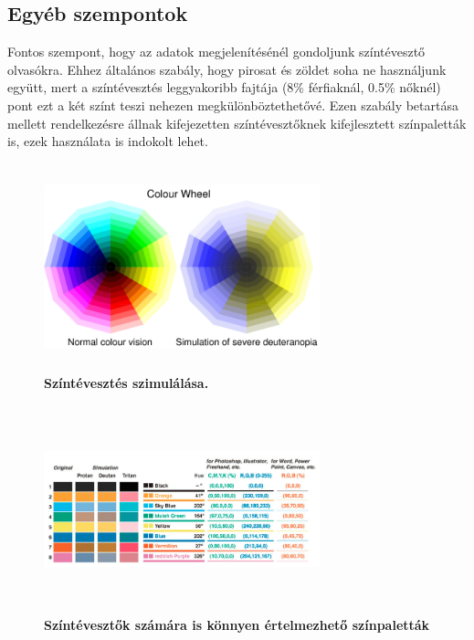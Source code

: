 \documentclass[12pt]{article}
\theoremstyle{plain}
\begin{document}
\subsection{Egyéb szempontok}

Fontos szempont, hogy az adatok megjelenítésénél gondoljunk  színtévesztő olvasókra. Ehhez általános szabály, hogy pirosat és zöldet soha ne használjunk együtt, mert a színtévesztés leggyakoribb fajtája (8\% férfiaknál, 0.5\% nőknél) pont ezt a két színt teszi nehezen megkülönböztethetővé. Ezen szabály betartása mellett rendelkezésre állnak kifejezetten színtévesztőknek kifejlesztett színpaletták is, ezek használata is indokolt lehet. 

\begin{figure}[H]
   \centering
   \includegraphics[width=8cm, height=6cm]{media/cwheel-polar.png}
   \caption{\textbf{Színtévesztés szimulálása.}}
   \label{fig:GeneralDiagram}
\end{figure}

\begin{figure}[H]
   \centering
   \includegraphics[width=8cm, height=6cm]{media/colorb.png}
   \caption{\textbf{Színtévesztők számára is könnyen értelmezhető színpaletták}}
   \label{fig:GeneralDiagram}
\end{figure}
\end{document}
